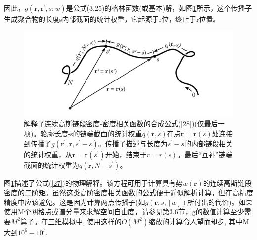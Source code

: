 因此，$g(\mathbf{r},\mathbf{r}^{'},s;w)$是公式(3.25)的格林函数(或基本)解，如图\ref{figure2}所示，这个传播子生成聚合物的长度s内部截面的统计权重，它起源于r位，终止于r位置。
\begin{figure}[h]
\centering
\includegraphics[width=15cm]{./figures/33.png}
\caption{解释了连续高斯链段密度-密度相关函数的合成公式(\ref{28})(仅最后一项)。轮廓长度-s的链端截面的统计权重$q(\mathbf{r},s)$在点$\mathbf{r}=\mathbf{r}(s)$处连接到传播子$g(\mathbf{r}^{'},\mathbf{r},s^{'}-s)$。传播子描述与长度为$s^{'}-s$的内部链段相关的统计权重，从$\mathbf{r}=\mathbf{r}(s^{'})$开始，结束于$r=r(s)$。最后“互补”链端截面的统计权重为$q(\mathbf{r},N-s^{'})$。}
\label{figure2}
\end{figure}

图\ref{figure2}描述了公式(\ref{27})的物理解释。该方程可用于计算具有势$w(\mathbf{r})$的连续高斯链段密度的二阶矩。虽然这类高阶密度相关函数的公式便于近似解析计算，但在高精度精度中应该避免。这是因为计算两点传播子(如$g(\mathbf{r},s,[w])$所付出的代价)。如果使用M个网格点或谱分量来求解空间自由度，请参见第3.6节，g的数值计算至少需要$M^2$算子。在三维模拟中, 使用这样的$O(M^2)$缩放的计算令人望而却步, 其中M大到$10^6-10^7$.
